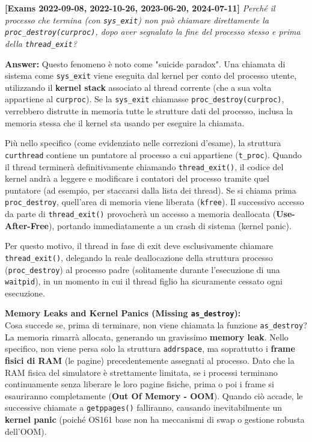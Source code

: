 \textbf{[Exams 2022-09-08, 2022-10-26, 2023-06-20, 2024-07-11]}
\textit{Perché il processo che termina (con \texttt{sys\_exit}) non può chiamare direttamente la \texttt{proc\_destroy(curproc)}, dopo aver segnalato la fine del processo stesso e prima della \texttt{thread\_exit}?}

\textbf{Answer:}
Questo fenomeno è noto come "suicide paradox". Una chiamata di sistema come \texttt{sys\_exit} viene eseguita dal kernel per conto del processo utente, utilizzando il \textbf{kernel stack} associato al thread corrente (che a sua volta appartiene al \texttt{curproc}).
Se la \texttt{sys\_exit} chiamasse \texttt{proc\_destroy(curproc)}, verrebbero distrutte in memoria tutte le strutture dati del processo, inclusa la memoria stessa che il kernel sta usando per eseguire la chiamata. 

Più nello specifico (come evidenziato nelle correzioni d'esame), la struttura \texttt{curthread} contiene un puntatore al processo a cui appartiene (\texttt{t\_proc}). Quando il thread terminerà definitivamente chiamando \texttt{thread\_exit()}, il codice del kernel andrà a leggere e modificare i contatori del processo tramite quel puntatore (ad esempio, per staccarsi dalla lista dei thread). Se si chiama prima \texttt{proc\_destroy}, quell'area di memoria viene liberata (\texttt{kfree}). Il successivo accesso da parte di \texttt{thread\_exit()} provocherà un accesso a memoria deallocata (\textbf{Use-After-Free}), portando immediatamente a un crash di sistema (kernel panic).

Per questo motivo, il thread in fase di exit deve esclusivamente chiamare \texttt{thread\_exit()}, delegando la reale deallocazione della struttura processo (\texttt{proc\_destroy}) al processo padre (solitamente durante l'esecuzione di una \texttt{waitpid}), in un momento in cui il thread figlio ha sicuramente cessato ogni esecuzione.

\textbf{Memory Leaks and Kernel Panics (Missing \texttt{as\_destroy}):}\\
Cosa succede se, prima di terminare, non viene chiamata la funzione \texttt{as\_destroy}? La memoria rimarrà allocata, generando un gravissimo \textbf{memory leak}. Nello specifico, non viene persa solo la struttura \texttt{addrspace}, ma soprattutto i \textbf{frame fisici di RAM} (le pagine) precedentemente assegnati al processo. 
Dato che la RAM fisica del simulatore è strettamente limitata, se i processi terminano continuamente senza liberare le loro pagine fisiche, prima o poi i frame si esauriranno completamente (\textbf{Out Of Memory - OOM}). Quando ciò accade, le successive chiamate a \texttt{getppages()} falliranno, causando inevitabilmente un \textbf{kernel panic} (poiché OS161 base non ha meccanismi di swap o gestione robusta dell'OOM).

